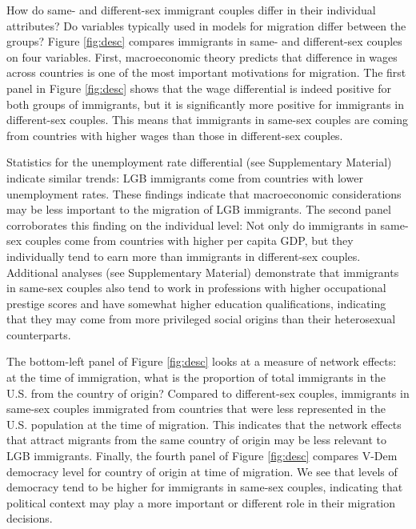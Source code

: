 \documentclass[
  11pt,
]{article}
\begin{document}
How do same- and different-sex immigrant couples differ in their individual attributes? Do variables typically used in models for migration differ between the groups? Figure \ref{fig:desc} compares immigrants in same- and different-sex couples on four variables. First, macroeconomic theory predicts that difference in wages across countries is one of the most important motivations for migration. The first panel in Figure \ref{fig:desc} shows that the wage differential is indeed positive for both groups of immigrants, but it is significantly more positive for immigrants in different-sex couples. This means that immigrants in same-sex couples are coming from countries with higher wages than those in different-sex couples.

Statistics for the unemployment rate differential (see Supplementary Material) indicate similar trends: LGB immigrants come from countries with lower unemployment rates. These findings indicate that macroeconomic considerations may be less important to the migration of LGB immigrants. The second panel corroborates this finding on the individual level: Not only do immigrants in same-sex couples come from countries with higher per capita GDP, but they individually tend to earn more than immigrants in different-sex couples. Additional analyses (see Supplementary Material) demonstrate that immigrants in same-sex couples also tend to work in professions with higher occupational prestige scores and have somewhat higher education qualifications, indicating that they may come from more privileged social origins than their heterosexual counterparts.

The bottom-left panel of Figure \ref{fig:desc} looks at a measure of network effects: at the time of immigration, what is the proportion of total immigrants in the U.S. from the country of origin? Compared to different-sex couples, immigrants in same-sex couples immigrated from countries that were less represented in the U.S. population at the time of migration. This indicates that the network effects that attract migrants from the same country of origin may be less relevant to LGB immigrants. Finally, the fourth panel of Figure \ref{fig:desc} compares V-Dem democracy level for country of origin at time of migration. We see that levels of democracy tend to be higher for immigrants in same-sex couples, indicating that political context may play a more important or different role in their migration decisions.
\end{document}

